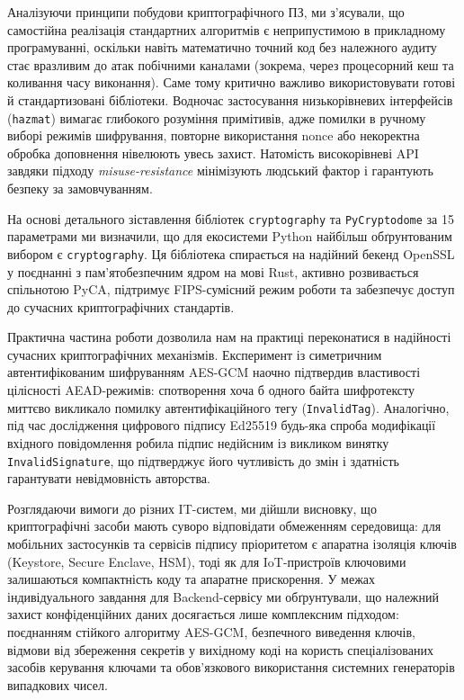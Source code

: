 \documentclass[12pt,a4paper]{article}
\begin{document}
Аналізуючи принципи побудови криптографічного ПЗ, ми з'ясували, що самостійна реалізація стандартних алгоритмів є неприпустимою в прикладному програмуванні, оскільки навіть математично точний код без належного аудиту стає вразливим до атак побічними каналами (зокрема, через процесорний кеш та коливання часу виконання). Саме тому критично важливо використовувати готові й стандартизовані бібліотеки. Водночас застосування низькорівневих інтерфейсів (\texttt{hazmat}) вимагає глибокого розуміння примітивів, адже помилки в ручному виборі режимів шифрування, повторне використання nonce або некоректна обробка доповнення нівелюють увесь захист. Натомість високорівневі API завдяки підходу \textit{misuse-resistance} мінімізують людський фактор і гарантують безпеку за замовчуванням.

На основі детального зіставлення бібліотек \texttt{cryptography} та \texttt{PyCryptodome} за 15 параметрами ми визначили, що для екосистеми Python найбільш обґрунтованим вибором є \texttt{cryptography}. Ця бібліотека спирається на надійний бекенд OpenSSL у поєднанні з пам'ятобезпечним ядром на мові Rust, активно розвивається спільнотою PyCA, підтримує FIPS-сумісний режим роботи та забезпечує доступ до сучасних криптографічних стандартів.

Практична частина роботи дозволила нам на практиці переконатися в надійності сучасних криптографічних механізмів. Експеримент із симетричним автентифікованим шифруванням AES-GCM наочно підтвердив властивості цілісності AEAD-режимів: спотворення хоча б одного байта шифротексту миттєво викликало помилку автентифікаційного тегу (\texttt{InvalidTag}). Аналогічно, під час дослідження цифрового підпису Ed25519 будь-яка спроба модифікації вхідного повідомлення робила підпис недійсним із викликом винятку \texttt{InvalidSignature}, що підтверджує його чутливість до змін і здатність гарантувати невідмовність авторства.

Розглядаючи вимоги до різних IT-систем, ми дійшли висновку, що криптографічні засоби мають суворо відповідати обмеженням середовища: для мобільних застосунків та сервісів підпису пріоритетом є апаратна ізоляція ключів (Keystore, Secure Enclave, HSM), тоді як для IoT-пристроїв ключовими залишаються компактність коду та апаратне прискорення. У межах індивідуального завдання для Backend-сервісу ми обґрунтували, що належний захист конфіденційних даних досягається лише комплексним підходом: поєднанням стійкого алгоритму AES-GCM, безпечного виведення ключів, відмови від збереження секретів у вихідному коді на користь спеціалізованих засобів керування ключами та обов'язкового використання системних генераторів випадкових чисел.
\end{document}
